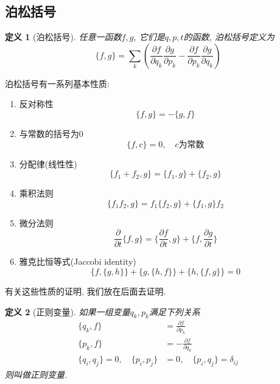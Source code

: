 \documentclass[a4paper,11pt]{book}
\newtheorem{definition}{\hspace{2em}定义}[section]
\begin{document}
\subsection{泊松括号}
\begin{definition}[泊松括号]
  任意一函数$f,g$, 它们是$q,p,t$的函数, 泊松括号定义为
  \begin{equation}\label{Poisson bracket}
    \{f,g\}=\sum_{k}\left(\frac{\partial f}{\partial{q_k}}\frac{\partial g}{\partial{p_k}}-\frac{\partial f}{\partial{p_k}}\frac{\partial g}{\partial{q_k}}\right)
  \end{equation}
\end{definition}
泊松括号有一系列基本性质:
\begin{enumerate}[(1)]
  \item\label{poisson 1} 反对称性
  \begin{equation*}
    \{f,g\}=-\{g,f\}
  \end{equation*}
  \item\label{poisson 2} 与常数的括号为$0$
  \begin{equation*}
    \{f,c\}=0,\quad\text{$c$为常数}
  \end{equation*}
  \item\label{poisson 3} 分配律(线性性)
  \begin{equation*}
    \{f_1+f_2,g\}=\{f_1,g\}+\{f_2,g\}
  \end{equation*}
  \item\label{poisson 4} 乘积法则
  \begin{equation*}
    \{f_1f_2,g\}=f_1\{f_2,g\}+\{f_1,g\}f_2
  \end{equation*}
  \item\label{poisson 5} 微分法则
  \begin{equation*}
    \frac{\partial}{\partial t}\{f,g\}=\{\frac{\partial f}{\partial t},g\}+\{f,\frac{\partial g}{\partial t}\}
  \end{equation*}
  \item\label{poisson 6} 雅克比恒等式(Jaccobi identity)
  \begin{equation*}
    \{f,\{g,h\}\}+\{g,\{h,f\}\}+\{h,\{f,g\}\}=0
  \end{equation*}
\end{enumerate}
有关这些性质的证明, 我们放在后面去证明.
\begin{definition}[正则变量]
  如果一组变量$q_k,p_k$满足下列关系
  \begin{equation*}
    \begin{split}
       \{q_k,f\} & =\frac{\partial f}{\partial{p_k}} \\
       \{p_k,f\} & =-\frac{\partial f}{\partial{q_k}} \\
       \{q_i,q_j\}=0,\quad \{p_i,p_j\}&=0,\quad \{p_i,q_j\}=\delta_{ij}
    \end{split}
  \end{equation*}
  则叫做正则变量.
\end{definition}
\end{document}
